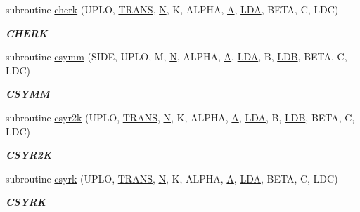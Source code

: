 \begin{DoxyCompactItemize}
subroutine \hyperlink{group__complex__blas__level3_gade9f14cf41f0cefea7918d716f3e1c20}{cherk} (U\+P\+L\+O, \hyperlink{superlu__enum__consts_8h_a0c4e17b2d5cea33f9991ccc6a6678d62a1f61e3015bfe0f0c2c3fda4c5a0cdf58}{T\+R\+A\+N\+S}, \hyperlink{polmisc_8c_a0240ac851181b84ac374872dc5434ee4}{N}, K, A\+L\+P\+H\+A, \hyperlink{classA}{A}, \hyperlink{example__user_8c_ae946da542ce0db94dced19b2ecefd1aa}{L\+D\+A}, B\+E\+T\+A, C, L\+D\+C)
\begin{DoxyCompactList}\small\item\em {\bfseries C\+H\+E\+R\+K} \end{DoxyCompactList}\item 
subroutine \hyperlink{group__complex__blas__level3_ga2490eea9e962fd69b9902e22aaa3a634}{csymm} (S\+I\+D\+E, U\+P\+L\+O, M, \hyperlink{polmisc_8c_a0240ac851181b84ac374872dc5434ee4}{N}, A\+L\+P\+H\+A, \hyperlink{classA}{A}, \hyperlink{example__user_8c_ae946da542ce0db94dced19b2ecefd1aa}{L\+D\+A}, B, \hyperlink{example__user_8c_a50e90a7104df172b5a89a06c47fcca04}{L\+D\+B}, B\+E\+T\+A, C, L\+D\+C)
\begin{DoxyCompactList}\small\item\em {\bfseries C\+S\+Y\+M\+M} \end{DoxyCompactList}\item 
subroutine \hyperlink{group__complex__blas__level3_gaa8320d51ded07cd3038db237fd400547}{csyr2k} (U\+P\+L\+O, \hyperlink{superlu__enum__consts_8h_a0c4e17b2d5cea33f9991ccc6a6678d62a1f61e3015bfe0f0c2c3fda4c5a0cdf58}{T\+R\+A\+N\+S}, \hyperlink{polmisc_8c_a0240ac851181b84ac374872dc5434ee4}{N}, K, A\+L\+P\+H\+A, \hyperlink{classA}{A}, \hyperlink{example__user_8c_ae946da542ce0db94dced19b2ecefd1aa}{L\+D\+A}, B, \hyperlink{example__user_8c_a50e90a7104df172b5a89a06c47fcca04}{L\+D\+B}, B\+E\+T\+A, C, L\+D\+C)
\begin{DoxyCompactList}\small\item\em {\bfseries C\+S\+Y\+R2\+K} \end{DoxyCompactList}\item 
subroutine \hyperlink{group__complex__blas__level3_ga1b4f63daf04fdf3061bd25dfec0d3e84}{csyrk} (U\+P\+L\+O, \hyperlink{superlu__enum__consts_8h_a0c4e17b2d5cea33f9991ccc6a6678d62a1f61e3015bfe0f0c2c3fda4c5a0cdf58}{T\+R\+A\+N\+S}, \hyperlink{polmisc_8c_a0240ac851181b84ac374872dc5434ee4}{N}, K, A\+L\+P\+H\+A, \hyperlink{classA}{A}, \hyperlink{example__user_8c_ae946da542ce0db94dced19b2ecefd1aa}{L\+D\+A}, B\+E\+T\+A, C, L\+D\+C)
\begin{DoxyCompactList}\small\item\em {\bfseries C\+S\+Y\+R\+K} \end{DoxyCompactList}\item 

\end{DoxyCompactItemize}
